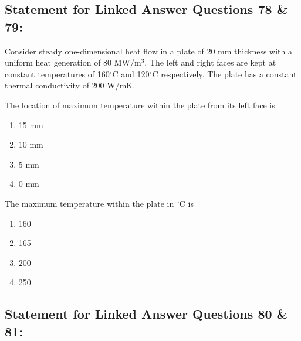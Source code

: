 \subsection{Statement for Linked Answer Questions 78 \& 79:}

Consider steady one-dimensional heat flow in a plate of 20 mm thickness with a uniform heat generation of 80 MW/m$^3$. The left and right faces are kept at constant temperatures of 160$^\circ$C and 120$^\circ$C respectively. The plate has a constant thermal conductivity of 200 W/mK.

\item The location of maximum temperature within the plate from its left face is
    \begin{enumerate}
        \item 15 mm
        \item 10 mm
        \item 5 mm
        \item 0 mm
    \end{enumerate}
    
    \item The maximum temperature within the plate in $^\circ$C is
    \begin{enumerate}
        \item 160
        \item 165
        \item 200
        \item 250
    \end{enumerate}

\subsection{Statement for Linked Answer Questions 80 \& 81:}

